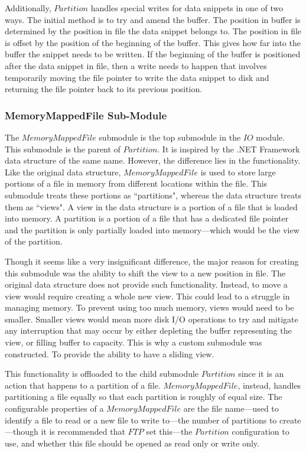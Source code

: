 Additionally, $Partition$ handles special writes for data snippets in one of two ways. The initial method is to try and amend the buffer. The position in buffer is determined by the position in file the data snippet belongs to. The position in file is offset by the position of the beginning of the buffer. This gives how far into the buffer the snippet needs to be written. If the beginning of the buffer is positioned after the data snippet in file, then a write needs to happen that involves temporarily moving the file pointer to write the data snippet to disk and returning the file pointer back to its previous position.

\subsubsection{MemoryMappedFile Sub-Module}

The $MemoryMappedFile$ submodule is the top submodule in the $IO$ module. This submodule is the parent of $Partition$. It is inspired by the .NET Framework data structure of the same name. However, the difference lies in the functionality. Like the original data structure, $MemoryMappedFile$ is used to store large portions of a file in memory from different locations within the file. This submodule treats these portions as ``partitions", whereas the data structure treats them as ``views". A view in the data structure is a portion of a file that is loaded into memory. A partition is a portion of a file that has a dedicated file pointer and the partition is only partially loaded into memory---which would be the view of the partition.

Though it seems like a very insignificant difference, the major reason for creating this submodule was the ability to shift the view to a new position in file. The original data structure does not provide such functionality. Instead, to move a view would require creating a whole new view. This could lead to a struggle in managing memory. To prevent using too much memory, views would need to be smaller. Smaller views would mean more disk I/O operations to try and mitigate any interruption that may occur by either depleting the buffer representing the view, or filling buffer to capacity. This is why a custom submodule was constructed. To provide the ability to have a sliding view.

This functionality is offloaded to the child submodule $Partition$ since it is an action that happens to a partition of a file. $MemoryMappedFile$, instead, handles partitioning a file equally so that each partition is roughly of equal size. The configurable properties of a $MemoryMappedFile$ are the file name---used to identify a file to read or a new file to write to---the number of partitions to create---though it is recommended that $FTP$ set this---the $Partition$ configuration to use, and whether this file should be opened as read only or write only.

